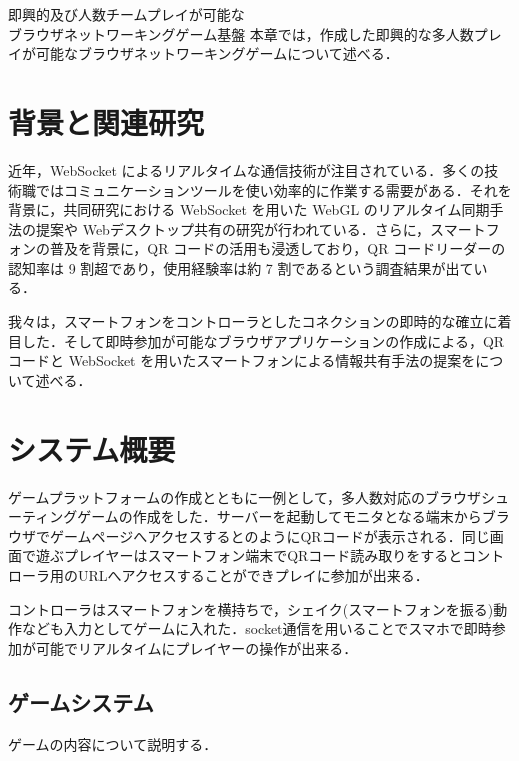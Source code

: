 \chapterhead
{即興的及び人数チームプレイが可能な\\ブラウザネットワーキングゲーム基盤}
{本章では，作成した即興的な多人数プレイが可能なブラウザネットワーキングゲームについて述べる．}


\section{背景と関連研究}
近年，WebSocket\cite{websocket} によるリアルタイムな通信技術が注目されている．多くの技術職ではコミュニケーションツールを使い効率的に作業する需要がある．それを背景に，共同研究における WebSocket を用いた WebGL のリアルタイム同期手法の提案\cite{websocket_webgl}や Webデスクトップ共有の研究が行われている\cite{websocket_desktop}．さらに，スマートフォンの普及\cite{smartphone_share}を背景に，QR コード\cite{qrcode}の活用も浸透しており，QR コードリーダーの認知率は 9 割超であり，使用経験率は約 7 割であるという調査結果が出ている\cite{qrcoderesearch}．

我々は，スマートフォンをコントローラとしたコネクションの即時的な確立に着目した．そして即時参加が可能なブラウザアプリケーションの作成による，QR コードと WebSocket を用いたスマートフォンによる情報共有手法の提案をについて述べる\cite{ec2015}．


\section{システム概要}

ゲームプラットフォームの作成とともに一例として，多人数対応のブラウザシューティングゲームの作成をした．サーバーを起動してモニタとなる端末からブラウザでゲームページへアクセスするとのようにQRコードが表示される．同じ画面で遊ぶプレイヤーはスマートフォン端末でQRコード読み取りをするとコントローラ用のURLへアクセスすることができプレイに参加が出来る．

コントローラはスマートフォンを横持ちで，シェイク(スマートフォンを振る)動作なども入力としてゲームに入れた．socket通信\cite{webpagesocketio}を用いることでスマホで即時参加が可能でリアルタイムにプレイヤーの操作が出来る．


\subsection{ゲームシステム}
ゲームの内容について説明する．


